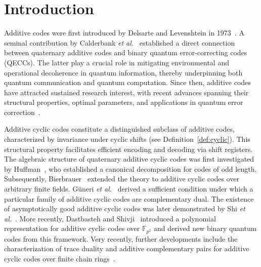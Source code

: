 \documentclass{aims}
\numberwithin{equation}{section}
\theoremstyle{definition}
\newcommand{\F}{\mathbb{F}}
\begin{document}
\maketitle


\section{Introduction}
Additive codes were first introduced by Delsarte and Levenshtein in 1973~\cite{delsarte1973}. A seminal contribution by Calderbank \textit{et al.}~\cite{calderbank1998} established a direct connection between quaternary additive codes and binary quantum error-correcting codes (QECCs). The latter play a crucial role in mitigating environmental and operational decoherence in quantum information, thereby underpinning both quantum communication and quantum computation. Since then, additive codes have attracted sustained research interest, with recent advances spanning their structural properties, optimal parameters, and applications in quantum error correction~\cite{abdukhalikov2026, bhowmick2026, benbelkacem2020, ezerman2011, huffman2013, kim2003, kim2017, kurz2026, mahmoudi2019}.

Additive cyclic codes constitute a distinguished subclass of additive codes, characterized by invariance under cyclic shifts (see Definition~\ref{def:cyclic}). This structural property facilitates efficient encoding and decoding via shift registers. The algebraic structure of quaternary additive cyclic codes was first investigated by Huffman~\cite{huffman2007}, who established a canonical decomposition for codes of odd length. Subsequently, Bierbrauer~\cite{bierbrauer2012} extended the theory to additive cyclic codes over arbitrary finite fields. G\"uneri \textit{et al.}~\cite{guneri2017} derived a sufficient condition under which a particular family of additive cyclic codes are complementary dual. The existence of asymptotically good additive cyclic codes was later demonstrated by Shi \textit{et al.}~\cite{shi2018}. More recently, Dastbasteh and Shivji~\cite{dastbasteh2023} introduced a polynomial representation for additive cyclic codes over $\F_{p^2}$ and derived new binary quantum codes from this framework. Very recently, further developments include the characterization of trace duality and additive complementary pairs for additive cyclic codes over finite chain rings~\cite{bhowmick2026}.
\end{document}
